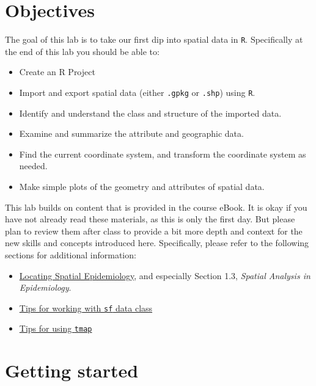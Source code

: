 \documentclass[
]{book}
\providecommand{\tightlist}{%
  \setlength{\itemsep}{0pt}\setlength{\parskip}{0pt}}
\begin{document}
\hypertarget{objectives}{%
\section{Objectives}\label{objectives}}

The goal of this lab is to take our first dip into spatial data in \texttt{R}. Specifically at the end of this lab you should be able to:

\begin{itemize}
\tightlist
\item
  Create an R Project
\item
  Import and export spatial data (either \texttt{.gpkg} or \texttt{.shp}) using \texttt{R}.\\
\item
  Identify and understand the class and structure of the imported data.
\item
  Examine and summarize the attribute and geographic data.
\item
  Find the current coordinate system, and transform the coordinate system as needed.
\item
  Make simple plots of the geometry and attributes of spatial data.
\end{itemize}

This lab builds on content that is provided in the course eBook. It is okay if you have not already read these materials, as this is only the first day. But please plan to review them after class to provide a bit more depth and context for the new skills and concepts introduced here. Specifically, please refer to the following sections for additional information:

\begin{itemize}
\tightlist
\item
  \href{https://mkram01.github.io/EPI563-SpatialEPI/locating-spatial-epidemiology.html}{Locating Spatial Epidemiology}, and especially Section 1.3, \emph{Spatial Analysis in Epidemiology}.
\item
  \href{https://mkram01.github.io/EPI563-SpatialEPI/sf-overview.html}{Tips for working with \texttt{sf} data class}
\item
  \href{https://mkram01.github.io/EPI563-SpatialEPI/intro-tmap.html}{Tips for using \texttt{tmap}}
\end{itemize}

\hypertarget{getting-started}{%
\section{Getting started}\label{getting-started}}
\end{document}
